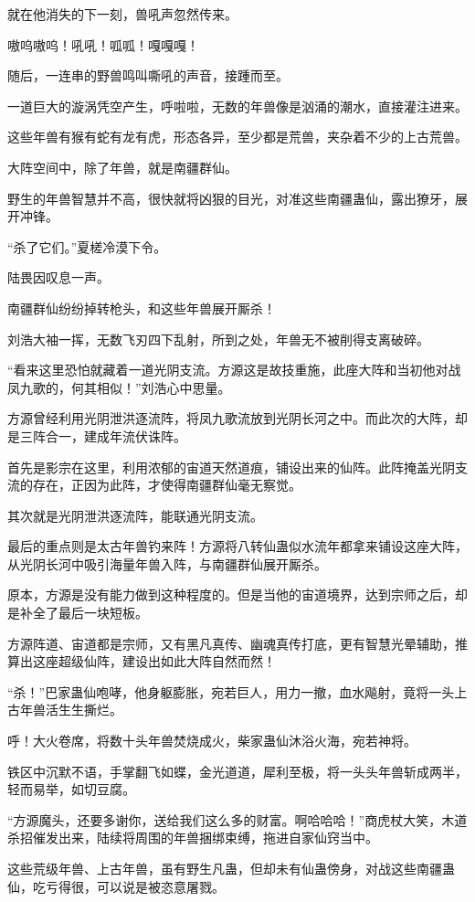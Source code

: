 \begin{this_body}
就在他消失的下一刻，兽吼声忽然传来。

嗷呜嗷呜！吼吼！呱呱！嘎嘎嘎！

随后，一连串的野兽鸣叫嘶吼的声音，接踵而至。

一道巨大的漩涡凭空产生，呼啦啦，无数的年兽像是汹涌的潮水，直接灌注进来。

这些年兽有猴有蛇有龙有虎，形态各异，至少都是荒兽，夹杂着不少的上古荒兽。

大阵空间中，除了年兽，就是南疆群仙。

野生的年兽智慧并不高，很快就将凶狠的目光，对准这些南疆蛊仙，露出獠牙，展开冲锋。

“杀了它们。”夏槎冷漠下令。

陆畏因叹息一声。

南疆群仙纷纷掉转枪头，和这些年兽展开厮杀！

刘浩大袖一挥，无数飞刃四下乱射，所到之处，年兽无不被削得支离破碎。

“看来这里恐怕就藏着一道光阴支流。方源这是故技重施，此座大阵和当初他对战凤九歌的，何其相似！”刘浩心中思量。

方源曾经利用光阴泄洪逐流阵，将凤九歌流放到光阴长河之中。而此次的大阵，却是三阵合一，建成年流伏诛阵。

首先是影宗在这里，利用浓郁的宙道天然道痕，铺设出来的仙阵。此阵掩盖光阴支流的存在，正因为此阵，才使得南疆群仙毫无察觉。

其次就是光阴泄洪逐流阵，能联通光阴支流。

最后的重点则是太古年兽钓来阵！方源将八转仙蛊似水流年都拿来铺设这座大阵，从光阴长河中吸引海量年兽入阵，与南疆群仙展开厮杀。

原本，方源是没有能力做到这种程度的。但是当他的宙道境界，达到宗师之后，却是补全了最后一块短板。

方源阵道、宙道都是宗师，又有黑凡真传、幽魂真传打底，更有智慧光晕辅助，推算出这座超级仙阵，建设出如此大阵自然而然！

“杀！”巴家蛊仙咆哮，他身躯膨胀，宛若巨人，用力一撤，血水飚射，竟将一头上古年兽活生生撕烂。

呼！大火卷席，将数十头年兽焚烧成火，柴家蛊仙沐浴火海，宛若神将。

铁区中沉默不语，手掌翻飞如蝶，金光道道，犀利至极，将一头头年兽斩成两半，轻而易举，如切豆腐。

“方源魔头，还要多谢你，送给我们这么多的财富。啊哈哈哈！”商虎杖大笑，木道杀招催发出来，陆续将周围的年兽捆绑束缚，拖进自家仙窍当中。

这些荒级年兽、上古年兽，虽有野生凡蛊，但却未有仙蛊傍身，对战这些南疆蛊仙，吃亏得很，可以说是被恣意屠戮。


\end{this_body}
